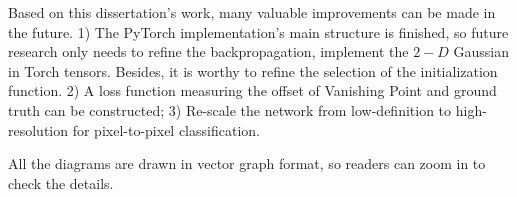 \begin{spacing}{1.5}
Based on this dissertation's work, many valuable improvements can be made in the future. 1) The PyTorch implementation's main structure is finished, so future research only needs to refine the backpropagation, implement the $2-D$ Gaussian in Torch tensors. Besides, it is worthy to refine the selection of the initialization function. 2) A loss function measuring the offset of Vanishing Point and ground truth can be constructed; 3) Re-scale the network from low-definition to high-resolution for pixel-to-pixel classification.

All the diagrams are drawn in vector graph format, so readers can zoom in to check the details.


\end{spacing}
\newpage
